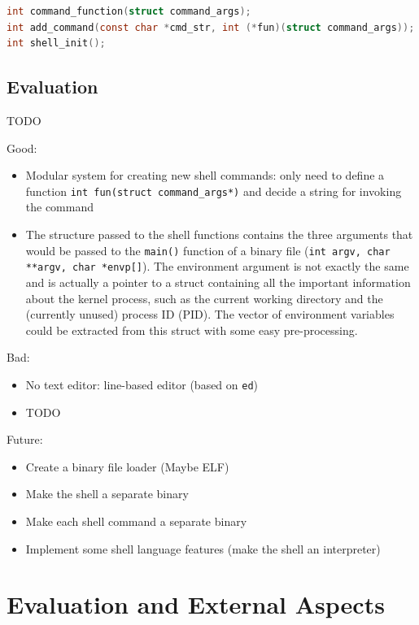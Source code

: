 \documentclass{article}
\begin{document}
\begin{lstlisting}[language=C,
                   caption={The signatures of some important functions for the
                   shell},
                   label={lst:shell-func-signatures}]
int command_function(struct command_args);
int add_command(const char *cmd_str, int (*fun)(struct command_args));
int shell_init();
\end{lstlisting}

\subsection{Evaluation}
TODO

Good:
\begin{itemize}
    \item Modular system for creating new shell commands: only need to define a
        function \texttt{int fun(struct command\_args*)} and decide a string for
        invoking the command
    \item The structure passed to the shell functions contains the three
        arguments that would be passed to the \texttt{main()} function of a
        binary file (\texttt{int argv, char **argv, char *envp[]}). The
        environment argument is not exactly the same and is actually a pointer
        to a struct containing all the important information about the kernel
        process, such as the current working directory and the (currently
        unused) process ID (PID). The vector of environment variables could be
        extracted from this struct with some easy pre-processing.
\end{itemize}
Bad:
\begin{itemize}
    \item No text editor: line-based editor (based on \texttt{ed})
    \item TODO
\end{itemize}
Future:
\begin{itemize}
    \item Create a binary file loader (Maybe ELF)
    \item Make the shell a separate binary
    \item Make each shell command a separate binary
    \item Implement some shell language features (make the shell an
        interpreter)
\end{itemize}

\section{Evaluation and External Aspects}
\end{document}
